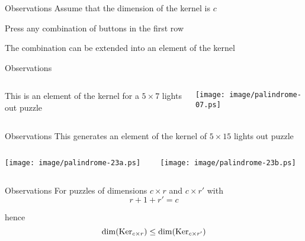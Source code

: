 \begin{frame}{Observations}
	Assume that the dimension of the kernel is $c$
	
	\bigskip
	
	Press any combination of buttons in the first row
	
	\bigskip
	
	The combination can be extended into an element of the kernel
\end{frame}

\begin{frame}{Observations}
	\begin{columns}
		\begin{column}{0.45\textwidth}
			This is an element of the kernel for a $5 \times 7$ lights out
			puzzle
		\end{column}
		\begin{column}{0.45\textwidth}
			\begin{center}
				\texttt{[image: image/palindrome-07.ps]}
			\end{center}
		\end{column}
	\end{columns}
\end{frame}

\begin{frame}{Observations}
	This generates an element of the kernel of $5 \times 15$ lights out puzzle 
	\begin{columns}
		\begin{column}{0.45\textwidth}
			\begin{center}
				\texttt{[image: image/palindrome-23a.ps]}
			\end{center}
		\end{column}
		\begin{column}{0.45\textwidth}
			\begin{center}
				\texttt{[image: image/palindrome-23b.ps]}
			\end{center}
		\end{column}
	\end{columns}
\end{frame}

\begin{frame}{Observations}
	For puzzles of dimensions $c \times r$ and $c \times r'$ with
	\[
		r + 1 + r' = c 
	\]
	
	\bigskip
	\pause
	
	hence
	\[
		\dim(\operatorname{Ker}_{c \times r}) \le \dim(\operatorname{Ker}_{c \times r'})
	\]
\end{frame}
